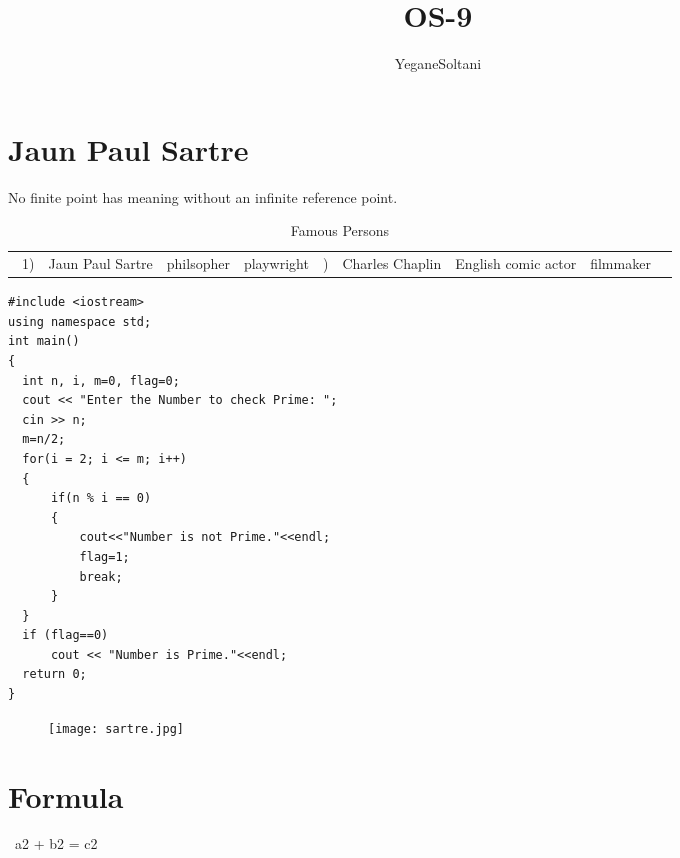\documentclass{article}
\begin{document}
\title{OS-9}
\maketitle
\author{YeganeSoltani }
\section{Jaun Paul Sartre}
No finite point has meaning without an infinite reference point.
\begin{table}[]
    \begin{center}
    \begin{tabular}{|c|c|c|c|}
         \hline
   \ 1) & Jaun Paul Sartre & philsopher & playwright &
    ) & Charles Chaplin & English comic actor & filmmaker &
     \hline
    \end{tabular}
    \caption{Famous Persons}
    \label{tab:my_label}
     \end{center}
\end{table}
\begin{lstlisting}
#include <iostream>  
using namespace std;  
int main()  
{  
  int n, i, m=0, flag=0;  
  cout << "Enter the Number to check Prime: ";  
  cin >> n;  
  m=n/2;  
  for(i = 2; i <= m; i++)  
  {  
      if(n % i == 0)  
      {  
          cout<<"Number is not Prime."<<endl;  
          flag=1;  
          break;  
      }  
  }  
  if (flag==0)  
      cout << "Number is Prime."<<endl;  
  return 0;  
}  

\end{lstlisting}
\begin{figure}
\texttt{[image: sartre.jpg]}
\end{figure}
\section{Formula}
$$\ a2 + b2 = c2
\end{document}
